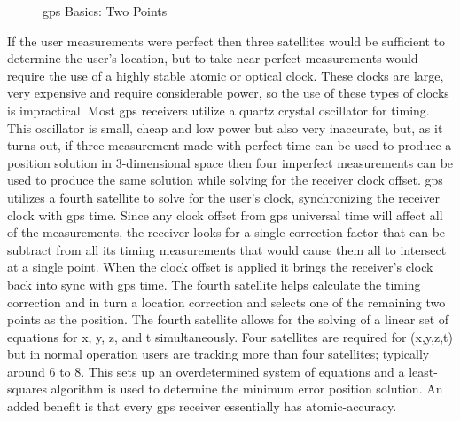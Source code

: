 \begin{figure}
	\centering
	\caption{\ac{gps} Basics: Two Points}
	\label{fig:GPS_Basics_3}
\end{figure}

If the user measurements were perfect then three satellites would be
sufficient to determine the user's location, but to take near perfect
measurements would require the use of a highly stable atomic or optical
clock. These clocks are large, very expensive and require considerable
power, so the use of these types of clocks is impractical. Most \ac{gps}
receivers utilize a quartz crystal oscillator for timing. This
oscillator is small, cheap and low power but also very inaccurate, but,
as it turns out, if three measurement made with perfect time can be used to produce a position solution in 3-dimensional space then four imperfect measurements can be used to produce the same solution while solving for the receiver clock offset. \ac{gps} utilizes a fourth satellite to solve for the user's clock, synchronizing the receiver clock with \ac{gps} time. Since any clock offset from \ac{gps} universal time will affect all of the measurements, the receiver looks for a single correction factor that can be subtract from all its timing measurements that would cause them all to intersect at a single
point. When the clock offset is applied it brings the receiver's clock back into sync with \ac{gps} time. The fourth satellite helps calculate the timing correction and in turn a location correction and selects one of the remaining two points as the position. The fourth satellite allows for the solving of a
linear set of equations for x, y, z, and t simultaneously. Four satellites are required for (x,y,z,t) but in normal operation users are tracking more than four satellites; typically around 6 to 8. This sets up an overdetermined system of equations and a least-squares algorithm is used to determine the minimum error position solution. An added benefit is that every \ac{gps} receiver essentially has atomic-accuracy.

